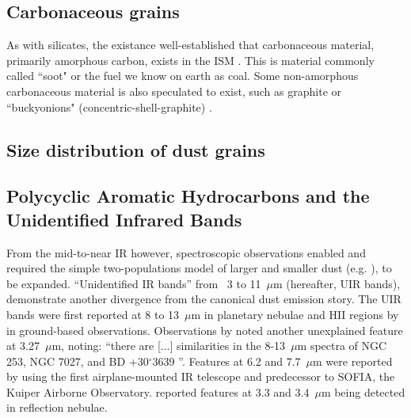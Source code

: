 \subsection{Carbonaceous grains}
      As with silicates, the existance well-established that carbonaceous material, primarily amorphous carbon, exists in the ISM \citep{aitken81,tielens87}. This is material commonly called ``soot" or the fuel we know on earth as coal.    Some non-amorphous carbonaceous material is also speculated to exist, such as graphite \citep{zhou06} or ``buckyonions" (concentric-shell-graphite) \citep{li08}.

\subsection{Size distribution of dust grains}


\subsection{Polycyclic Aromatic Hydrocarbons and the Unidentified Infrared Bands}

    From the mid-to-near IR however, spectroscopic observations enabled and required the simple two-populations model of larger and smaller dust (e.g. \cite{mathis77}), to be expanded. ``Unidentified IR bands'' from~ 3 to 11~$\mu$m (hereafter, UIR bands), demonstrate another divergence from the canonical dust emission story. The UIR bands were first reported at 8 to 13~$\mu$m in planetary nebulae and HII regions by \cite{gillet73, gillett75} in ground-based observations. Observations by \cite{merrill75} noted another unexplained feature at 3.27~$\mu$m, noting: ``there are [...] similarities in the 8-13~$\mu$m spectra of NGC 253, NGC 7027, and BD +30$^\circ$3639 \cite{gillett75}''. Features at 6.2 and 7.7~$\mu$m were reported by \cite{russell77b} using the first airplane-mounted IR telescope and predecessor to SOFIA, the Kuiper Airborne Observatory. \cite{sellgren83} reported features at 3.3 and 3.4~$\mu$m being detected in reflection nebulae.

